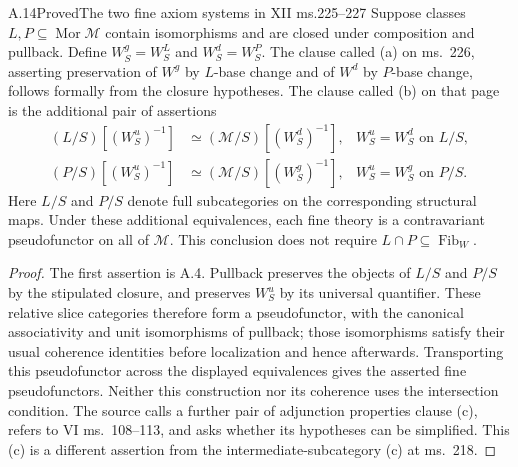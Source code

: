 \begin{claim}{A.14}{Proved}{The two fine axiom systems in XII ms.225--227}
Suppose classes $L,P\subseteq\operatorname{Mor}\mathcal M$ contain isomorphisms and are closed under composition and pullback. Define $W_S^g=W_S^L$ and $W_S^d=W_S^P$. The clause called (a) on ms.~226, asserting preservation of $W^g$ by $L$-base change and of $W^d$ by $P$-base change, follows formally from the closure hypotheses. The clause called (b) on that page is the additional pair of assertions
\[
\begin{aligned}
(L/S)[(W_S^u)^{-1}]&\simeq(\mathcal M/S)[(W_S^d)^{-1}],
 &W_S^u=W_S^d\text{ on }L/S,\\
(P/S)[(W_S^u)^{-1}]&\simeq(\mathcal M/S)[(W_S^g)^{-1}],
 &W_S^u=W_S^g\text{ on }P/S.
\end{aligned}
\]
Here $L/S$ and $P/S$ denote full subcategories on the corresponding structural maps. Under these additional equivalences, each fine theory is a contravariant pseudofunctor on all of $\mathcal M$. This conclusion does not require $L\cap P\subseteq\operatorname{Fib}_W$.
\end{claim}
\begin{proof}
The first assertion is A.4. Pullback preserves the objects of $L/S$ and $P/S$ by the stipulated closure, and preserves $W_S^u$ by its universal quantifier. These relative slice categories therefore form a pseudofunctor, with the canonical associativity and unit isomorphisms of pullback; those isomorphisms satisfy their usual coherence identities before localization and hence afterwards. Transporting this pseudofunctor across the displayed equivalences gives the asserted fine pseudofunctors. Neither this construction nor its coherence uses the intersection condition. The source calls a further pair of adjunction properties clause (c), refers to VI ms.~108--113, and asks whether its hypotheses can be simplified. This (c) is a different assertion from the intermediate-subcategory (c) at ms.~218.
\end{proof}

